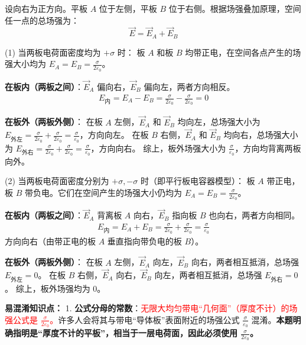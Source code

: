 \begin{enumerate}
	设向右为正方向。平板 $A$ 位于左侧，平板 $B$ 位于右侧。根据场强叠加原理，空间任一点的总场强为：
	\begin{equation}\label{eq:L7-9-2}
		\vec{E} = \vec{E}_A + \vec{E}_B
	\end{equation}
	
	(1) 当两板电荷面密度均为 $+\sigma$ 时：
	板 $A$ 和板 $B$ 均带正电，在空间各点产生的场强大小均为 $E_A = E_B = \frac{\sigma}{2\varepsilon_0}$。
	
	\textbf{在板内（两板之间）}：$\vec{E}_A$ 偏向右，$\vec{E}_B$ 偏向左，两者方向相反。
	\begin{align*}
		E_{\text{内}} = E_A - E_B = \frac{\sigma}{2\varepsilon_0} - \frac{\sigma}{2\varepsilon_0} = 0
	\end{align*}
	
	\textbf{在板外（两板外侧）}：
	在板 $A$ 左侧，$\vec{E}_A$ 和 $\vec{E}_B$ 均向左，总场强大小为 $E_{\text{外左}} = \frac{\sigma}{2\varepsilon_0} + \frac{\sigma}{2\varepsilon_0} = \frac{\sigma}{\varepsilon_0}$，方向向左。
	在板 $B$ 右侧，$\vec{E}_A$ 和 $\vec{E}_B$ 均向右，总场强大小为 $E_{\text{外右}} = \frac{\sigma}{2\varepsilon_0} + \frac{\sigma}{2\varepsilon_0} = \frac{\sigma}{\varepsilon_0}$，方向向右。
	综上，板外场强大小为 $\frac{\sigma}{\varepsilon_0}$，方向均背离两板向外。
	
	(2) 当两板电荷面密度分别为 $+\sigma, -\sigma$ 时（即平行板电容器模型）：
	板 $A$ 带正电，板 $B$ 带负电。它们在空间产生的场强大小仍均为 $E_A = E_B = \frac{\sigma}{2\varepsilon_0}$。
	
	\textbf{在板内（两板之间）}：$\vec{E}_A$ 背离板 $A$ 向右，$\vec{E}_B$ 指向板 $B$ 也向右，两者方向相同。
	\begin{align*}
		E_{\text{内}} = E_A + E_B = \frac{\sigma}{2\varepsilon_0} + \frac{\sigma}{2\varepsilon_0} = \frac{\sigma}{\varepsilon_0}
	\end{align*}
	方向向右（由带正电的板 $A$ 垂直指向带负电的板 $B$）。
	
	\textbf{在板外（两板外侧）}：
	在板 $A$ 左侧，$\vec{E}_A$ 向左，$\vec{E}_B$ 向右，两者相互抵消，总场强 $E_{\text{外左}} = 0$。
	在板 $B$ 右侧，$\vec{E}_A$ 向右，$\vec{E}_B$ 向左，两者相互抵消，总场强 $E_{\text{外右}} = 0$。
	综上，板外场强均为 $0$。
	
	\textbf{易混淆知识点： }
	1. \textbf{公式分母的常数}：\textcolor{red}{无限大均匀带电“几何面”（厚度不计）的场强公式是 $\frac{\sigma}{2\varepsilon_0}$。}许多人会将其与带电“导体板”表面附近的场强公式 $\frac{\sigma}{\varepsilon_0}$ 混淆。\textbf{本题明确指明是“厚度不计的平板”，相当于一层电荷面，因此必须使用 $\frac{\sigma}{2\varepsilon_0}$。}
	

\end{enumerate}

